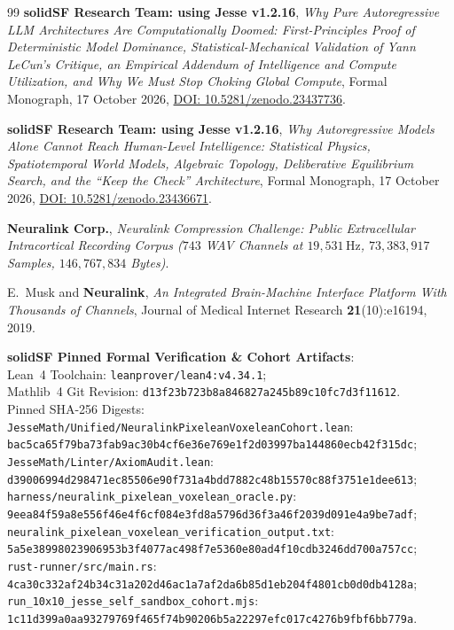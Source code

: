 \documentclass[11pt,letterpaper]{article}
\theoremstyle{definition}
\begin{document}
\begin{thebibliography}{99}
\textbf{solidSF Research Team: using Jesse v1.2.16}, \emph{Why Pure Autoregressive LLM Architectures Are Computationally Doomed: First-Principles Proof of Deterministic Model Dominance, Statistical-Mechanical Validation of Yann LeCun's Critique, an Empirical Addendum of Intelligence and Compute Utilization, and Why We Must Stop Choking Global Compute}, Formal Monograph, 17 October 2026, \href{https://doi.org/10.5281/zenodo.23437736}{DOI: 10.5281/zenodo.23437736}.

\textbf{solidSF Research Team: using Jesse v1.2.16}, \emph{Why Autoregressive Models Alone Cannot Reach Human-Level Intelligence: Statistical Physics, Spatiotemporal World Models, Algebraic Topology, Deliberative Equilibrium Search, and the ``Keep the Check'' Architecture}, Formal Monograph, 17 October 2026, \href{https://doi.org/10.5281/zenodo.23436671}{DOI: 10.5281/zenodo.23436671}.

\textbf{Neuralink Corp.}, \emph{Neuralink Compression Challenge: Public Extracellular Intracortical Recording Corpus ($743$ WAV Channels at $19{,}531\,\text{Hz}$, $73{,}383{,}917$ Samples, $146{,}767{,}834$ Bytes)}.

E.~Musk and \textbf{Neuralink}, \emph{An Integrated Brain-Machine Interface Platform With Thousands of Channels}, Journal of Medical Internet Research \textbf{21}(10):e16194, 2019.

\textbf{solidSF Pinned Formal Verification \& Cohort Artifacts}:\\
Lean~4 Toolchain: \nolinkurl{leanprover/lean4:v4.34.1};\\
Mathlib~4 Git Revision: \nolinkurl{d13f23b723b8a846827a245b89c10fc7d3f11612}.\\
Pinned SHA-256 Digests:\\
\nolinkurl{JesseMath/Unified/NeuralinkPixeleanVoxeleanCohort.lean}:\\
\nolinkurl{bac5ca65f79ba73fab9ac30b4cf6e36e769e1f2d03997ba144860ecb42f315dc};\\
\nolinkurl{JesseMath/Linter/AxiomAudit.lean}:\\
\nolinkurl{d39006994d298471ec85506e90f731a4bdd7882c48b15570c88f3751e1dee613};\\
\nolinkurl{harness/neuralink_pixelean_voxelean_oracle.py}:\\
\nolinkurl{9eea84f59a8e556f46e4f6cf084e3fd8a5796d36f3a46f2039d091e4a9be7adf};\\
\nolinkurl{neuralink_pixelean_voxelean_verification_output.txt}:\\
\nolinkurl{5a5e38998023906953b3f4077ac498f7e5360e80ad4f10cdb3246dd700a757cc};\\
\nolinkurl{rust-runner/src/main.rs}:\\
\nolinkurl{4ca30c332af24b34c31a202d46ac1a7af2da6b85d1eb204f4801cb0d0db4128a};\\
\nolinkurl{run_10x10_jesse_self_sandbox_cohort.mjs}:\\
\nolinkurl{1c11d399a0aa93279769f465f74b90206b5a22297efc017c4276b9fbf6bb779a}.

\end{thebibliography}
\end{document}
